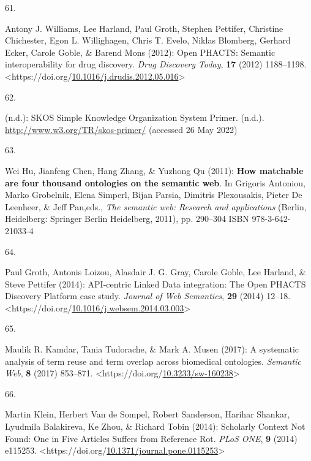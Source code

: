 \begin{thebibliography}{9}
\hypertarget{ref-williamsOpenPHACTSSemantic2012c}{}
61.

Antony J. Williams, Lee Harland, Paul Groth, Stephen Pettifer, Christine
Chichester, Egon L. Willighagen, Chris T. Evelo, Niklas Blomberg,
Gerhard Ecker, Carole Goble, \& Barend Mons (2012): Open {PHACTS}:
Semantic interoperability for drug discovery. \emph{Drug Discovery
Today}, \textbf{17} (2012) 1188--1198.
\textless https://doi.org/\href{https://doi.org/10.1016/j.drudis.2012.05.016}{10.1016/j.drudis.2012.05.016}\textgreater{}

\hypertarget{ref-w3-skos-primer}{}
62.

(n.d.): {SKOS Simple Knowledge Organization System Primer}. (n.d.).
\url{http://www.w3.org/TR/skos-primer/} (accessed 26 May 2022)

\hypertarget{ref-huHowMatchableAre2011a}{}
63.

Wei Hu, Jianfeng Chen, Hang Zhang, \& Yuzhong Qu (2011): \textbf{How
matchable are four thousand ontologies on the semantic web}. In Grigoris
Antoniou, Marko Grobelnik, Elena Simperl, Bijan Parsia, Dimitris
Plexousakis, Pieter De Leenheer, \& Jeff Pan,eds., \emph{The semantic
web: {Research} and applications} ({Berlin, Heidelberg}: {Springer
Berlin Heidelberg}, 2011), pp. 290--304 ISBN 978-3-642-21033-4

\hypertarget{ref-grothAPIcentricLinkedData2014b}{}
64.

Paul Groth, Antonis Loizou, Alasdair J. G. Gray, Carole Goble, Lee
Harland, \& Steve Pettifer (2014): {API-centric Linked Data}
integration: {The Open PHACTS Discovery Platform} case study.
\emph{Journal of Web Semantics}, \textbf{29} (2014) 12--18.
\textless https://doi.org/\href{https://doi.org/10.1016/j.websem.2014.03.003}{10.1016/j.websem.2014.03.003}\textgreater{}

\hypertarget{ref-kamdarSystematicAnalysisTerm2017a}{}
65.

Maulik R. Kamdar, Tania Tudorache, \& Mark A. Musen (2017): A systematic
analysis of term reuse and term overlap across biomedical ontologies.
\emph{Semantic Web}, \textbf{8} (2017) 853--871.
\textless https://doi.org/\href{https://doi.org/10.3233/sw-160238}{10.3233/sw-160238}\textgreater{}

\hypertarget{ref-kleinScholarlyContextNot2014a}{}
66.

Martin Klein, Herbert Van de Sompel, Robert Sanderson, Harihar Shankar,
Lyudmila Balakireva, Ke Zhou, \& Richard Tobin (2014): Scholarly
{Context Not Found}: {One} in {Five Articles Suffers} from {Reference
Rot}. \emph{PLoS ONE}, \textbf{9} (2014) e115253.
\textless https://doi.org/\href{https://doi.org/10.1371/journal.pone.0115253}{10.1371/journal.pone.0115253}\textgreater{}


\end{thebibliography}
